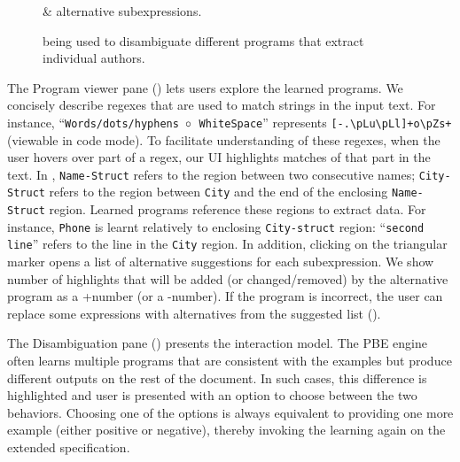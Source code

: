 \begin{figure}[t]
    \uwsinglespace
    \begin{tcbraster}[beamer, raster columns=1, size=minimal]
        \centering
    \end{tcbraster}
    \caption{\ProgramNavigationTab \& alternative subexpressions.}
    \label{fig:interactive:ui:alternatives}
\end{figure}

\begin{figure}[t]
    \begin{tcbraster}[beamer, raster columns=1, size=minimal]
        \centering
    \end{tcbraster}
    \caption{\ConversationalClarification being used to disambiguate different programs that extract individual
    authors.}
    \label{fig:interactive:ui:disambiguation}
\end{figure}

The Program viewer pane () lets users explore the learned programs.
We concisely describe regexes that are used to match strings in the input text.
For instance, ``\texttt{Words/dots/hyphens $\mathrel{\circ}$ WhiteSpace}''
represents \texttt{[-.\textbackslash p{Lu}\textbackslash  p{Ll}]+o\textbackslash p{Zs}+} (viewable in code mode).
To facilitate understanding of these regexes, when the user hovers over
part of a regex, our UI highlights matches of that part in the text.
In , \texttt{Name-Struct} refers to the region
between two consecutive names; \texttt{City-Struct} refers to the region
between \texttt{City} and the end of the enclosing \texttt{Name-Struct} region.
Learned programs reference these regions to extract data.
For instance, \texttt{Phone} is learnt relatively to enclosing
\texttt{City-struct} region: ``\texttt{second line}'' refers to the line in the \texttt{City} region.
In addition, clicking on the triangular marker opens a list of alternative suggestions for each subexpression.
We show number of highlights that will be added (or changed/removed) by the alternative
program as a +number (or a -number).
If the program is incorrect, the user can replace some expressions with alternatives from the suggested list
().

The Disambiguation pane () presents the \ConversationalClarification interaction
model.
The PBE engine often learns multiple programs that are consistent with the examples but produce different outputs
on the rest of the document.
In such cases, this difference is highlighted and user is presented with an option to choose between the two behaviors.
Choosing one of the options is always equivalent to providing one more example (either positive or negative), thereby
invoking the learning again on the extended specification.

